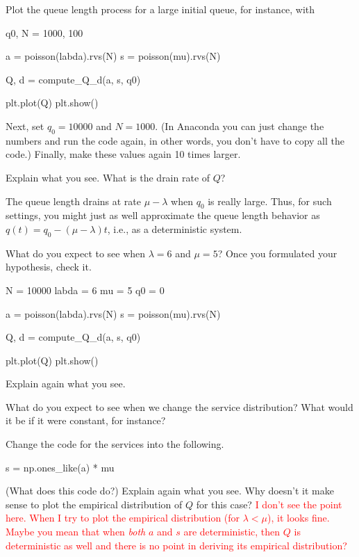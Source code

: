 \documentclass{scrartcl}
\newcommand{\notet}[1]{\textcolor{red}{#1}}
\begin{document}
\begin{exercise}
Plot the queue length process for a large initial queue, for instance, with

\begin{pyverbatim}
q0, N = 1000, 100

a = poisson(labda).rvs(N)
s = poisson(mu).rvs(N)

Q, d = compute_Q_d(a, s, q0)

plt.plot(Q)
plt.show()
  \end{pyverbatim}

Next, set $q_0=10000$ and $N=1000$.  (In Anaconda you can just change the numbers and run the code again, in other words, you don't have to copy all the code.) Finally,  make these values again 10 times larger. 

Explain what you see. What is the drain rate of $Q$?
\begin{solution}
  The queue length drains at rate $\mu-\lambda$ when $q_0$ is really large. Thus, for such settings, you might just as well approximate the queue length behavior as $q(t) = q_0 - (\mu-\lambda)t$, i.e., as a deterministic system.
\end{solution}
\end{exercise}

\begin{exercise}
What do you expect to see when $\lambda=6$ and $\mu=5$? Once you formulated your hypothesis, check it.

\begin{pyverbatim}
N = 10000
labda = 6
mu = 5
q0 = 0

a = poisson(labda).rvs(N)
s = poisson(mu).rvs(N)

Q, d = compute_Q_d(a, s, q0)

plt.plot(Q)
plt.show()
  \end{pyverbatim}
Explain again what you see.
\end{exercise}

\begin{exercise}
What do you expect to see when we change the service distribution? What would it be if it were constant, for instance?

Change the code for the services into the following.
\begin{pyverbatim}
s = np.ones_like(a) * mu
\end{pyverbatim}
(What does this code do?) Explain again what you see. Why doesn't it make sense to plot the empirical distribution of $Q$ for this case? \notet{I don't see the point here. When I try to plot the empirical distribution (for $\lambda < \mu$), it looks fine. Maybe you mean that when \emph{both} $a$ and $s$ are deterministic, then $Q$ is deterministic as well and there is no point in deriving its empirical distribution?}
\end{exercise}
\end{document}
